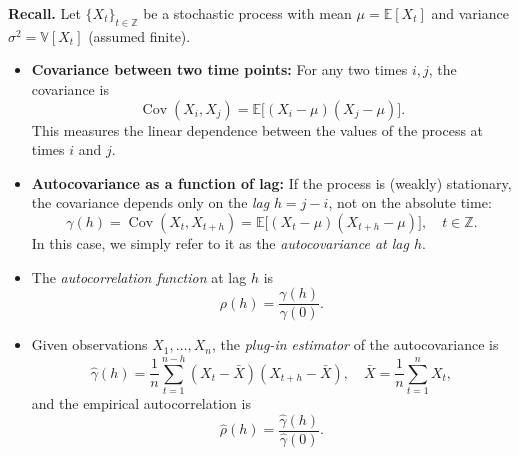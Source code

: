 \documentclass[a4,a4paper,10pt,notitlepage,english]{article}
\theoremstyle{definition}
\begin{document}
	
	\begin{center}
\end{center}
	\bigskip

	
	
\textbf{Recall.} 
Let $\{X_t\}_{t \in \mathbb{Z}}$ be a stochastic process with mean $\mu = \mathbb{E}[X_t]$ 
and variance $\sigma^2 = \mathbb{V}[X_t]$ (assumed finite).

\begin{itemize}
  \item \textbf{Covariance between two time points:} For any two times $i,j$, the covariance is
  \[
    \operatorname{Cov}(X_i, X_j) = \mathbb{E}\!\big[ (X_i - \mu)(X_j - \mu) \big].
  \]
  This measures the linear dependence between the values of the process at times $i$ and $j$.

  \item \textbf{Autocovariance as a function of lag:} If the process is (weakly) stationary, the covariance 
  depends only on the \emph{lag} $h = j-i$, not on the absolute time:
  \[
    \gamma(h) = \operatorname{Cov}(X_t, X_{t+h}) 
    = \mathbb{E}\!\big[ (X_t - \mu)(X_{t+h} - \mu) \big], \quad t \in \mathbb{Z}.
  \]
  In this case, we simply refer to it as the \emph{autocovariance at lag $h$}.

  \item The \emph{autocorrelation function} at lag $h$ is
  \[
    \rho(h) = \frac{\gamma(h)}{\gamma(0)}.
  \]

  \item Given observations $X_1, \dots, X_n$, the \emph{plug-in estimator} 
  of the autocovariance is
  \[
    \hat{\gamma}(h) = \frac{1}{n} \sum_{t=1}^{n-h} 
    (X_t - \bar{X})(X_{t+h} - \bar{X}), 
    \quad \bar{X} = \frac{1}{n} \sum_{t=1}^n X_t,
  \]
  and the empirical autocorrelation is
  \[
    \hat{\rho}(h) = \frac{\hat{\gamma}(h)}{\hat{\gamma}(0)}.
  \]
\end{itemize}
\end{document}
